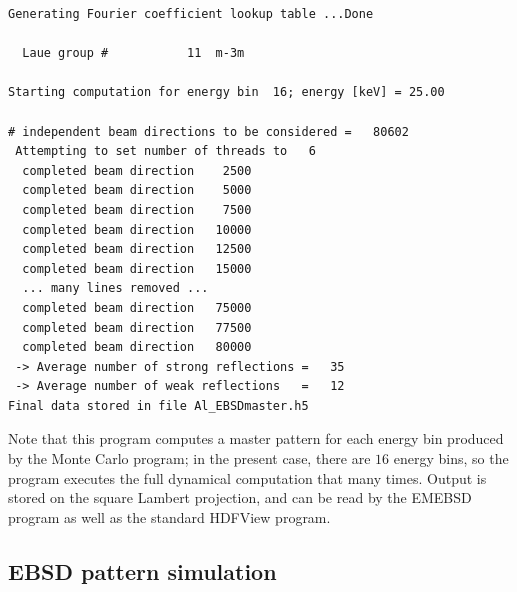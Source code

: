 \documentclass[DIV=calc, paper=letter, fontsize=11pt]{scrartcl}	 %
\newcommand{\button}[1]{\colorbox{green}{\textsf{#1}} button}
\begin{document}
\begin{verbatim}
Generating Fourier coefficient lookup table ...Done

  Laue group #           11  m-3m

Starting computation for energy bin  16; energy [keV] = 25.00

# independent beam directions to be considered =   80602
 Attempting to set number of threads to   6
  completed beam direction    2500
  completed beam direction    5000
  completed beam direction    7500
  completed beam direction   10000
  completed beam direction   12500
  completed beam direction   15000
  ... many lines removed ...
  completed beam direction   75000
  completed beam direction   77500
  completed beam direction   80000
 -> Average number of strong reflections =   35
 -> Average number of weak reflections   =   12
Final data stored in file Al_EBSDmaster.h5
\end{verbatim}
Note that this program computes a master pattern for each energy bin produced by the Monte Carlo program; in the
present case, there are $16$ energy bins, so the program executes the full dynamical computation that many times.
Output is stored on the square Lambert projection, and can be read by the \textsf{EMEBSD} program as well as
the standard HDFView program.

\subsection{EBSD pattern simulation}
%
%
\end{document}
